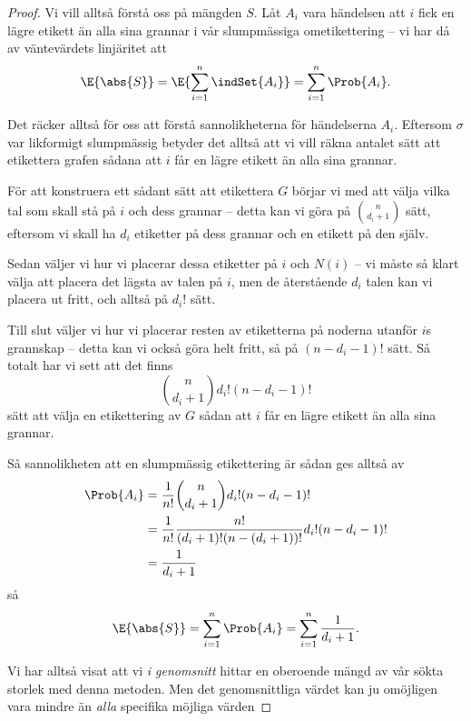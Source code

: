 \documentclass[nobib]{tufte-handout}
\begin{document}
\begin{theorem}
\begin{proof}
        Vi vill alltså förstå oss på mängden $S$. Låt $A_i$ vara händelsen att $i$ fick en lägre etikett än alla sina grannar i vår slumpmässiga ometikettering -- vi har då av väntevärdets linjäritet att
        $$\E{\abs{S}} = \E{\sum_{i=1}^{n} \indSet{A_i}} = \sum_{i=1}^{n} \Prob{A_i}.$$
        
        Det räcker alltså för oss att förstå sannolikheterna för händelserna $A_i$. Eftersom $\sigma$ var likformigt slumpmässig betyder det alltså att vi vill räkna antalet sätt att etikettera grafen sådana att $i$ får en lägre etikett än alla sina grannar.

        För att konstruera ett sådant sätt att etikettera $G$ börjar vi med att välja vilka tal som skall stå på $i$ och dess grannar -- detta kan vi göra på $\binom{n}{d_i + 1}$ sätt, eftersom vi skall ha $d_i$ etiketter på dess grannar och en etikett på den själv.

        Sedan väljer vi hur vi placerar dessa etiketter på $i$ och $N(i)$ -- vi måste så klart välja att placera det lägsta av talen på $i$, men de återstående $d_i$ talen kan vi placera ut fritt, och alltså på $d_i!$ sätt.

        Till slut väljer vi hur vi placerar resten av etiketterna på noderna utanför $i$s grannskap -- detta kan vi också göra helt fritt, så på $(n - d_i - 1)!$ sätt. Så totalt har vi sett att det finns
        $$\binom{n}{d_i + 1} d_i! (n - d_i - 1)!$$
        sätt att välja en etikettering av $G$ sådan att $i$ får en lägre etikett än alla sina grannar.

        Så sannolikheten att en slumpmässig etikettering är sådan ges alltså av
        \begin{align*}
            \Prob{A_i} &= \frac{1}{n!}\binom{n}{d_i + 1} d_i! (n - d_i - 1)!\\
            &= \frac{1}{n!}\frac{n!}{(d_i + 1)!(n - (d_i + 1))!}d_i! (n - d_i - 1)!\\
            &= \frac{1}{d_i + 1}
        \end{align*}
        så
        $$\E{\abs{S}} = \sum_{i=1}^{n} \Prob{A_i} = \sum_{i=1}^{n} \frac{1}{d_i + 1}.$$

        Vi har alltså visat att vi \emph{i genomsnitt} hittar en oberoende mängd av vår sökta storlek med denna metoden. Men det genomsnittliga värdet kan ju omöjligen vara mindre än \emph{alla} specifika möjliga värden
\end{proof}
\end{theorem}
\end{document}
